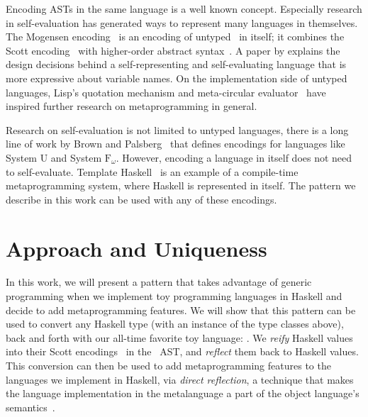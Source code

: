 Encoding ASTs in the same language is a well known concept.
Especially research in self-evaluation has generated ways to represent many
languages in themselves.  The Mogensen encoding~\cite{mogensen} is an encoding
of untyped \lc\ in itself; it combines the Scott encoding~\cite{scott} with
higher-order abstract syntax~\cite{hoas}.
A paper by \citet{stump2009directly} explains the design decisions behind a
self-representing and self-evaluating language that is more expressive about
variable names.  On the implementation side of untyped languages, Lisp's
quotation mechanism and meta-circular evaluator~\cite{mccarthy1965lisp}
have inspired further research on metaprogramming in general.

Research on self-evaluation is not limited to untyped languages, there is a
long line of work by Brown and
Palsberg~\cite{brownU,brownBreaking,brownIntensional} that defines encodings
for languages like System U and System $\text{F}_\omega$.
However, encoding a language in itself does not need to self-evaluate.
Template Haskell~\cite{sheard2002template} is an example of a compile-time
metaprogramming system, where Haskell is represented in itself.
The pattern we describe in this work can be used with any of these encodings.


\section{Approach and Uniqueness}

In this work, we will present a pattern that takes advantage of generic programming
when we implement toy programming languages in Haskell and decide to add
metaprogramming features. We will show that this pattern
can be used to convert any Haskell type (with an instance of the type classes
above), back and forth with our all-time favorite toy language: \lc.
We \mbox{\emph{reify}} Haskell values into their Scott encodings~\cite{scott}
in the \lc\ AST, and \mbox{\emph{reflect}} them back to Haskell values.
This conversion can then be used to add metaprogramming features to the languages we implement in Haskell, via
  \emph{direct reflection}, a technique that makes the language implementation
  in the metalanguage a part of the object language's semantics~\cite{barzilayphd}.

